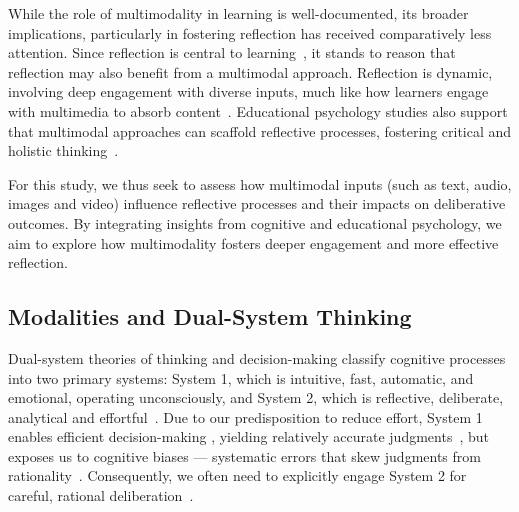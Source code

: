 While the role of multimodality in learning is well-documented, its broader implications, particularly in fostering reflection has received comparatively less attention. Since reflection is central to learning~\cite{kolb2014experiential}, it stands to reason that reflection may also benefit from a multimodal approach. Reflection is dynamic, involving deep engagement with diverse inputs, much like how learners engage with multimedia to absorb content~\cite{moon2013handbook}. Educational psychology studies also support that multimodal approaches can scaffold reflective processes, fostering critical and holistic thinking~\cite{fleming2001vark, mayer2005cambridge}.

For this study, we thus seek to assess how multimodal inputs (such as text, audio, images and video) influence reflective processes and their impacts on deliberative outcomes. By integrating insights from cognitive and educational psychology, we aim to explore how multimodality fosters deeper engagement and more effective reflection.

\subsection{Modalities and Dual-System Thinking}
\label{sec: dual system thinking}
Dual-system theories of thinking and decision-making classify cognitive processes into two primary systems: System 1, which is intuitive, fast, automatic, and emotional, operating unconsciously, and System 2, which is reflective, deliberate, analytical and effortful~\cite{kahneman2011thinking, strack2004reflective, sloman1996empirical}. %
Due to our predisposition to reduce effort, System 1
enables efficient decision-making%
, yielding relatively accurate judgments~\cite{shah2008heuristics}, but
exposes us to cognitive biases --- systematic errors that skew judgments from rationality~\cite{caraban201923, kahneman1991anomalies}. %
 Consequently, we often need to explicitly engage System 2 for careful, rational deliberation~\cite{kahneman2011thinking, sloman1996empirical}.

